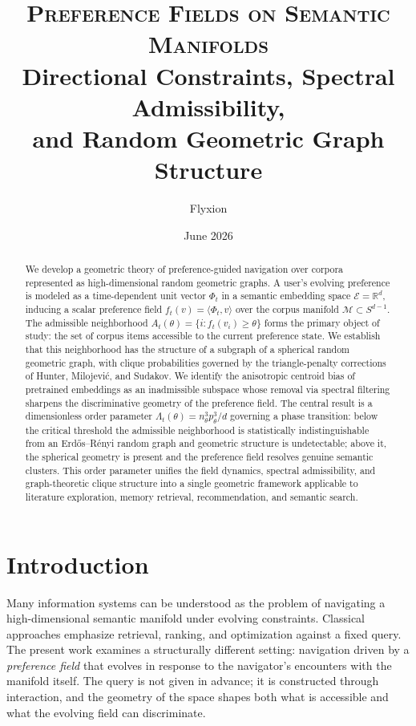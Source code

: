 \documentclass[12pt, a4paper]{article}
\title{\textsc{Preference Fields on Semantic Manifolds}\\
\large Directional Constraints, Spectral Admissibility,\\
and Random Geometric Graph Structure}
\author{Flyxion}
\date{June 2026}
\theoremstyle{plain}
\theoremstyle{definition}
\begin{document}
\maketitle

\begin{abstract}
We develop a geometric theory of preference-guided navigation over corpora
represented as high-dimensional random geometric graphs. A user's evolving
preference is modeled as a time-dependent unit vector $\Phi_t$ in a semantic
embedding space $\mathcal{E} = \mathbb{R}^d$, inducing a scalar preference
field $f_t(v) = \langle \Phi_t, v \rangle$ over the corpus manifold
$\mathcal{M} \subset S^{d-1}$. The admissible neighborhood $A_t(\theta) =
\{i : f_t(v_i) \ge \theta\}$ forms the primary object of study: the set of
corpus items accessible to the current preference state. We establish that
this neighborhood has the structure of a subgraph of a spherical random
geometric graph, with clique probabilities governed by the triangle-penalty
corrections of Hunter, Milojević, and Sudakov. We identify the anisotropic
centroid bias of pretrained embeddings as an inadmissible subspace whose
removal via spectral filtering sharpens the discriminative geometry of the
preference field. The central result is a dimensionless order parameter
$\Lambda_t(\theta) = n_\theta^3 p_\theta^3 / d$ governing a phase
transition: below the critical threshold the admissible neighborhood is
statistically indistinguishable from an Erd\H{o}s--R\'enyi random graph and
geometric structure is undetectable; above it, the spherical geometry is
present and the preference field resolves genuine semantic clusters. This
order parameter unifies the field dynamics, spectral admissibility, and
graph-theoretic clique structure into a single geometric framework applicable
to literature exploration, memory retrieval, recommendation, and semantic
search.
\end{abstract}

\tableofcontents
\newpage

\section{Introduction}

Many information systems can be understood as the problem of navigating a
high-dimensional semantic manifold under evolving constraints. Classical
approaches emphasize retrieval, ranking, and optimization against a fixed
query. The present work examines a structurally different setting: navigation
driven by a \textit{preference field} that evolves in response to the
navigator's encounters with the manifold itself. The query is not given in
advance; it is constructed through interaction, and the geometry of the space
shapes both what is accessible and what the evolving field can discriminate.
\end{document}
